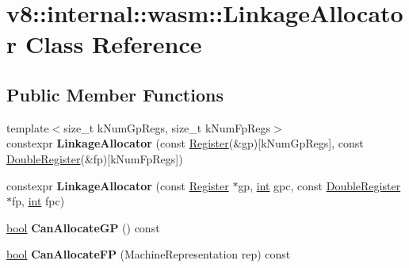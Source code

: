 \hypertarget{classv8_1_1internal_1_1wasm_1_1LinkageAllocator}{}\section{v8\+:\+:internal\+:\+:wasm\+:\+:Linkage\+Allocator Class Reference}
\label{classv8_1_1internal_1_1wasm_1_1LinkageAllocator}
\subsection*{Public Member Functions}
\begin{DoxyCompactItemize}
\item 
\mbox{\label{classv8_1_1internal_1_1wasm_1_1LinkageAllocator_aac8d92c63a326fd9652b7e3ac3729fdf}} 
{\footnotesize template$<$size\+\_\+t k\+Num\+Gp\+Regs, size\+\_\+t k\+Num\+Fp\+Regs$>$ }\\constexpr {\bfseries Linkage\+Allocator} (const \mbox{\hyperlink{classv8_1_1internal_1_1Register}{Register}}(\&gp)\mbox{[}k\+Num\+Gp\+Regs\mbox{]}, const \mbox{\hyperlink{classv8_1_1internal_1_1DoubleRegister}{Double\+Register}}(\&fp)\mbox{[}k\+Num\+Fp\+Regs\mbox{]})
\item 
\mbox{\label{classv8_1_1internal_1_1wasm_1_1LinkageAllocator_ae0bb6352c0aba8446ec06e2a963cc7d5}} 
constexpr {\bfseries Linkage\+Allocator} (const \mbox{\hyperlink{classv8_1_1internal_1_1Register}{Register}} $\ast$gp, \mbox{\hyperlink{classint}{int}} gpc, const \mbox{\hyperlink{classv8_1_1internal_1_1DoubleRegister}{Double\+Register}} $\ast$fp, \mbox{\hyperlink{classint}{int}} fpc)
\item 
\mbox{\label{classv8_1_1internal_1_1wasm_1_1LinkageAllocator_a904ea070dd0585b68950a93416a59356}} 
\mbox{\hyperlink{classbool}{bool}} {\bfseries Can\+Allocate\+GP} () const
\item 
\mbox{\label{classv8_1_1internal_1_1wasm_1_1LinkageAllocator_adaf700b27f4f319a7462bc206dbe8b38}} 
\mbox{\hyperlink{classbool}{bool}} {\bfseries Can\+Allocate\+FP} (Machine\+Representation rep) const
\item 
\mbox{\label{classv8_1_1internal_1_1wasm_1_1LinkageAllocator_a8e3aeba1884af06ce2cee008143d9ffe}} 

\end{DoxyCompactItemize}
